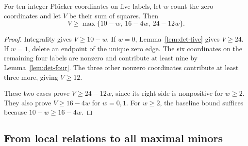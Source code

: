 \begin{lemma}
\label{lem:det-five-defect}
For ten integer Pl\"ucker coordinates on five labels, let $w$ count
the zero coordinates and let $V$ be their sum of squares. Then
\begin{equation}
 V\ge\max\{10-w,\ 16-4w,\ 24-12w\}.
 \label{eq:det-local-defect}
\end{equation}
\end{lemma}
\begin{proof}
Integrality gives $V\ge10-w$. If $w=0$,
Lemma~\ref{lem:det-five} gives $V\ge24$. If $w=1$, delete an endpoint
of the unique zero edge. The six coordinates on the remaining four
labels are nonzero and contribute at least nine by
Lemma~\ref{lem:det-four}. The three other nonzero coordinates contribute
at least three more, giving $V\ge12$.

These two cases prove $V\ge24-12w$, since its right side is
nonpositive for $w\ge2$. They also prove $V\ge16-4w$ for $w=0,1$.
For $w\ge2$, the baseline bound suffices because
$10-w\ge16-4w$.
\end{proof}

\subsection{From local relations to all maximal minors}

